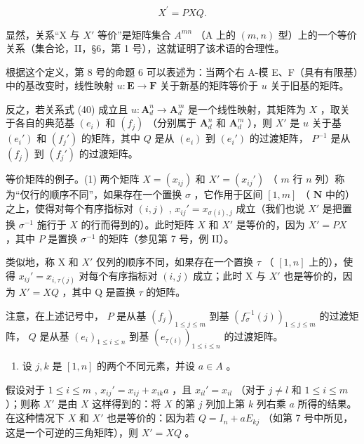 \[
X ^ {\prime} = P X Q.\tag{40}
\]

显然，关系“X 与 \(X'\) 等价”是矩阵集合 \(A^{mn}\) （A 上的 \((m, n)\) 型）上的一个等价关系（集合论，II，§6，第 1 号），这就证明了该术语的合理性。

根据这个定义，第 8 号的命题 6 可以表述为：当两个右 A-模 E、F（具有有限基）中的基改变时，线性映射 \(u \colon \mathbf{E} \to \mathbf{F}\) 关于新基的矩阵等价于 \(u\) 关于旧基的矩阵。

反之，若关系式 (40) 成立且 \(u \colon \mathbf{A}_d^n \to \mathbf{A}_d^m\) 是一个线性映射，其矩阵为 \(X\) ，取关于各自的典范基 \((e_i)\) 和 \((f_j)\) （分别属于 \(\mathbf{A}_d^n\) 和 \(\mathbf{A}_d^m\) ），则 \(X'\) 是 \(u\) 关于基 \((e_i')\) 和 \((f_j')\) 的矩阵，其中 \(Q\) 是从 \((e_i)\) 到 \((e_i')\) 的过渡矩阵， \(P^{-1}\) 是从 \((f_j)\) 到 \((f_j')\) 的过渡矩阵。

等价矩阵的例子。(1) 两个矩阵 \(X = (x_{ij})\) 和 \(X' = (x_{ij}')\) （ \(m\) 行 \(n\) 列）称为“仅行的顺序不同”，如果存在一个置换 \(\sigma\) ，它作用于区间 \([1, m]\) （ \(\mathbf{N}\) 中的）之上，使得对每个有序指标对 \((i,j)\) , \(x_{ij}' = x_{\sigma(i),j}\) 成立（我们也说 \(X'\) 是把置换 \(\sigma^{-1}\) 施行于 \(X\) 的行而得到的）。此时矩阵 \(X\) 和 \(X'\) 是等价的，因为 \(X' = PX\) ，其中 \(P\) 是置换 \(\sigma^{-1}\) 的矩阵（参见第 7 号，例 II）。

类似地，称 X 和 \(X'\) 仅列的顺序不同，如果存在一个置换 \(\tau\) （ \([1, n]\) 上的），使得 \(x_{ij}' = x_{i,\tau(j)}\) 对每个有序指标对 \((i,j)\) 成立；此时 X 与 \(X'\) 也是等价的，因为 \(X' = XQ\) ，其中 Q 是置换 \(\tau\) 的矩阵。

注意，在上述记号中， \(P\) 是从基 \((f_j)_{1 \leqslant j \leqslant m}\) 到基 \((f_\sigma^{-1}(j))_{1 \leqslant j \leqslant m}\) 的过渡矩阵， \(Q\) 是从基 \((e_i)_{1 \leqslant i \leqslant n}\) 到基 \((e_{\tau(i)})_{1 \leqslant i \leqslant n}\) 的过渡矩阵。

\begin{enumerate}
\def\labelenumi{(\arabic{enumi})}
\setcounter{enumi}{1}
\tightlist
\item
  设 \(j, k\) 是 \([1, n]\) 的两个不同元素，并设 \(a \in A\) 。
\end{enumerate}

假设对于 \(1 \leqslant i \leqslant m\) , \(x_{ij}' = x_{ij} + x_{ik}a\) ，且 \(x_{il}' = x_{il}\) （对于 \(j \neq l\) 和 \(1 \leqslant i \leqslant m\) ）；则称 \(X'\) 是由 \(X\) 这样得到的：将 \(X\) 的第 \(j\) 列加上第 \(k\) 列右乘 \(a\) 所得的结果。在这种情况下 \(X\) 和 \(X'\) 也是等价的：因为若 \(Q = I_n + aE_{kj}\) （如第 7 号中所见，这是一个可逆的三角矩阵），则 \(X' = XQ\) 。

